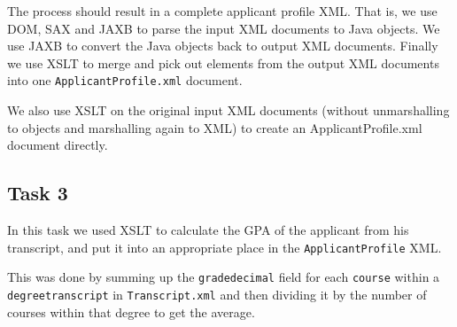 \documentclass[a4paper, 11pt]{article}
\begin{document}
The process should result in a complete applicant profile XML. That is, we use DOM, SAX and JAXB to parse the input XML documents to Java objects. We use JAXB to convert the Java objects back to output XML documents. Finally we use XSLT to merge and pick out elements from the output XML documents into one \texttt{ApplicantProfile.xml} document.

We also use XSLT on the original input XML documents (without unmarshalling to objects and marshalling again to XML) to create an ApplicantProfile.xml document directly.

\subsection{Task 3}

In this task we used XSLT to calculate the GPA of the applicant from his transcript, and put it into an appropriate place in the \texttt{ApplicantProfile} XML.

This was done by summing up the \texttt{gradedecimal} field for each \texttt{course} within a \texttt{degreetranscript} in \texttt{Transcript.xml} and then dividing it by the number of courses within that degree to get the average.
\end{document}
